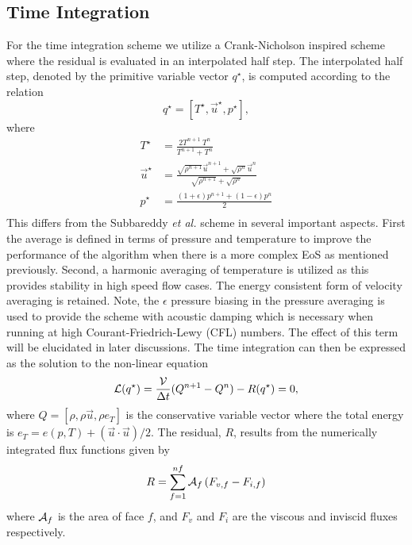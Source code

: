 \subsection{Time Integration}

For the time integration scheme we utilize a Crank-Nicholson inspired
scheme where the residual is evaluated in an interpolated half step.
The interpolated half step, denoted by the primitive variable vector
$q^{\star}$, is computed according to the relation
\begin{equation}
  q^{\star} = \left[ T^{\star}, \vec{u}^{\star}, p^{\star} \right ],
\label{half_step}
\end{equation}
where 
\begin{equation}
\begin{aligned}
  T^{\star} &= \frac{2 T^{n+1} ~ T^{n}}{T^{n+1} + T^{n}} \\
  \vec{u}^{\star} &= \frac{\sqrt{\rho^{n+1}} \vec{u}^{n+1}+\sqrt{\rho^{n}} \vec{u}^n} {\sqrt{\rho^{n+1}}+\sqrt{\rho^n}} \\
p^{\star} &= \frac{(1+\epsilon)p^{n+1} + (1-\epsilon)p^{n}}{2}\\
\label{eq:temporalavg}
\end{aligned}
\end{equation} 
This differs from the Subbareddy {\it et al.} \cite{Subbareddy.2009}
scheme in several important aspects.  First the average is defined in
terms of pressure and temperature to improve the performance
of the algorithm when there is a more complex EoS as mentioned
previously.  Second, a harmonic averaging of temperature is utilized
as this provides stability in high speed flow cases.  The energy
consistent form of velocity averaging is retained.  Note, the
$\epsilon$ pressure biasing in the pressure averaging is used to
provide the scheme with acoustic damping which is necessary when
running at high Courant-Friedrich-Lewy (CFL) numbers.  The effect of
this term will be elucidated in later discussions.  The time
integration can then be expressed as the solution to the non-linear
equation
\begin{equation}
\mathcal{L}(q^{\star})=\frac{\mathcal{V}}{\Delta t} (Q^{n+1} - Q^n) - R(q^{\star}) = 0 ,
\label{Lcn}
\end{equation}
where $Q = \left[ \rho, \rho\vec{u}, \rho e_T \right]$ is the
conservative variable vector where the total energy is $e_T =
e(p,T)+(\vec{u}\cdot \vec{u})/2$.  The residual, $R$, results from the
numerically integrated flux functions given by
\begin{equation}
R = \sum_{f=1}^{nf} \mathcal{A}_f \left( F_{v,f} - F_{i,f} \right)
\end{equation}
where $\mathcal{A}_f$ is the area of face $f$, and $F_v$ and $F_i$ are the
viscous and inviscid fluxes respectively.

